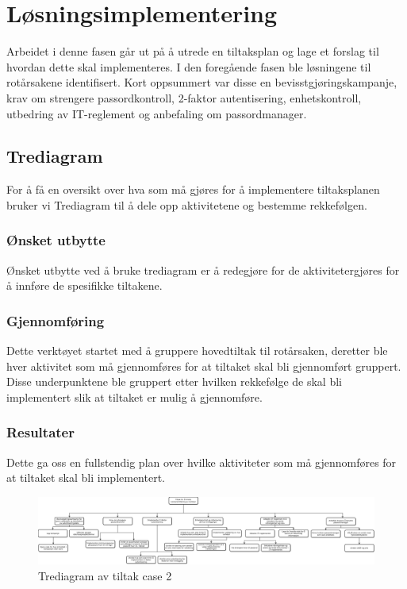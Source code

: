 \chapter{Løsningsimplementering}
Arbeidet i denne fasen går ut på å utrede en tiltaksplan og lage et forslag til hvordan dette skal implementeres. I den foregående fasen ble løsningene til rotårsakene identifisert. Kort oppsummert var disse en bevisstgjøringskampanje, krav om strengere passordkontroll, 2-faktor autentisering, enhetskontroll, utbedring av IT-reglement og anbefaling om passordmanager. 

\section{Trediagram}
For å få en oversikt over hva som må gjøres for å implementere tiltaksplanen bruker vi Trediagram til å dele opp aktivitetene og bestemme rekkefølgen. 

\subsection{Ønsket utbytte}
Ønsket utbytte ved å bruke trediagram er å redegjøre for de aktivitetergjøres for å innføre de spesifikke tiltakene. 

\subsection{Gjennomføring}
Dette verktøyet startet med å gruppere hovedtiltak til rotårsaken, deretter ble hver aktivitet som må gjennomføres for at tiltaket skal bli gjennomført gruppert. Disse underpunktene ble gruppert etter hvilken rekkefølge de skal bli implementert slik at tiltaket er mulig å gjennomføre. 

\subsection{Resultater}
Dette ga oss en fullstendig plan over hvilke aktiviteter som må gjennomføres for at tiltaket skal bli implementert.

\begin{figure}[p] 
    \centering    
    \includegraphics[scale=0.4, angle=90]{case_2/bilder/trediagram.pdf}
    \caption[Trediagram av tiltak case 2]{Trediagram av tiltak case 2}
    \label{fig:trediagram-case2}
\end{figure}


